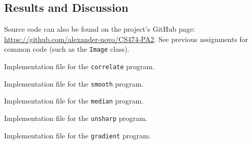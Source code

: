 \documentclass[headings=optiontoheadandtoc,listof=totoc,parskip=full]{scrartcl}
\newenvironment{longlisting}{\captionsetup{type=listing}}{}
\begin{document}
\subsection{Results and Discussion}
\label{sec:gradient-results}

\clearpage
\listoflistings

Source code can also be found on the project's GitHub page: \url{https://github.com/alexander-novo/CS474-PA2}. See previous assignments for common code (such as the \texttt{Image} class).

\begin{longlisting}
	\caption{Implementation file for the \texttt{correlate} program.}
	\label{lst:correlate}
\end{longlisting}

\begin{longlisting}
	\caption{Implementation file for the \texttt{smooth} program.}
	\label{lst:smooth}
\end{longlisting}

\begin{longlisting}
	\caption{Implementation file for the \texttt{median} program.}
	\label{lst:median}
\end{longlisting}

\begin{longlisting}
	\caption{Implementation file for the \texttt{unsharp} program.}
	\label{lst:unsharp}
\end{longlisting}

\begin{longlisting}
	\caption{Implementation file for the \texttt{gradient} program.}
	\label{lst:gradient}
\end{longlisting}
\end{document}
